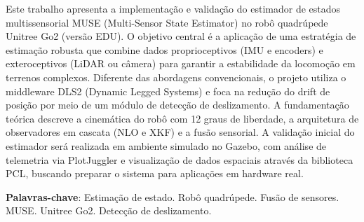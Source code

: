 
\setlength{\absparsep}{18pt} %
\begin{resumo}
Este trabalho apresenta a implementação e validação do estimador de estados 
multissensorial MUSE (Multi-Sensor State Estimator) no robô quadrúpede Unitree 
Go2 (versão EDU). O objetivo central é a aplicação de uma estratégia de estimação
 robusta que combine dados proprioceptivos (IMU e encoders) e exteroceptivos 
 (LiDAR ou câmera) para garantir a estabilidade da locomoção em terrenos 
 complexos. Diferente das abordagens convencionais, o projeto utiliza o 
 middleware DLS2 (Dynamic Legged Systems) e foca na redução do drift de posição 
 por meio de um módulo de detecção de deslizamento. A fundamentação teórica descreve 
 a cinemática do robô com 12 graus de liberdade, a arquitetura de observadores em 
 cascata (NLO e XKF) e a fusão sensorial. A validação inicial do estimador será 
 realizada em ambiente simulado no Gazebo, com análise de telemetria via 
 PlotJuggler e visualização de dados espaciais através da biblioteca PCL, 
 buscando preparar o sistema para aplicações em hardware real.

 \textbf{Palavras-chave}: Estimação de estado. Robô quadrúpede. Fusão de sensores. MUSE. Unitree Go2. Detecção de deslizamento.
\end{resumo}
